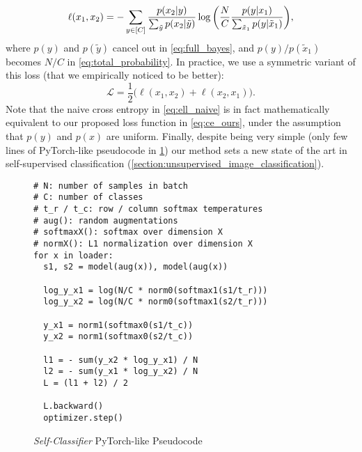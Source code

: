 \documentclass[runningheads]{llncs}
\begin{document}
\begin{equation}
    \small
    \ell(x_1, x_2) = -\sum_{y \in [C]}{\frac{p(x_2|y)}{\sum_{\tilde{y}}{p(x_2|\tilde{y})}}\log \bigg(\frac{N}{C}\frac{p(y|x_1)}{\sum_{\tilde{x}_1}{p(y|\tilde{x}_1)}}\bigg)},
    \label{eq:ce_ours}
\end{equation}
where $p(y)$ and $p(\tilde{y})$ cancel out in \cref{eq:full_bayes}, and $p(y)/p(\tilde{x}_1)$ becomes $N/C$ in \cref{eq:total_probability}. In practice, we use a symmetric variant of this loss (that we empirically noticed to be better):
\begin{equation}
    \mathcal{L} = \frac{1}{2}\bigg(\ell(x_1, x_2) + \ell(x_2, x_1)\bigg).
    \label{eq:L_sym}
\end{equation}
Note that the naive cross entropy in \cref{eq:ell_naive} is in fact mathematically equivalent to our proposed loss function in \cref{eq:ce_ours}, under the assumption that $p(y)$ and $p(x)$ are uniform. Finally, despite being very simple (only few lines of PyTorch-like pseudocode in \cref{algo:pseudo_code}) our method sets a new state of the art in self-supervised classification (\cref{section:unsupervised_image_classification}).

\begin{figure}[ht]
\centering
\begin{minipage}{.87\linewidth}
    \begin{algorithm}[H]
        \caption{{\it Self-Classifier} PyTorch-like Pseudocode}
        \begin{lstlisting}
# N: number of samples in batch
# C: number of classes
# t_r / t_c: row / column softmax temperatures
# aug(): random augmentations
# softmaxX(): softmax over dimension X
# normX(): L1 normalization over dimension X
for x in loader:
  s1, s2 = model(aug(x)), model(aug(x))

  log_y_x1 = log(N/C * norm0(softmax1(s1/t_r)))
  log_y_x2 = log(N/C * norm0(softmax1(s2/t_r)))

  y_x1 = norm1(softmax0(s1/t_c))
  y_x2 = norm1(softmax0(s2/t_c))

  l1 = - sum(y_x2 * log_y_x1) / N
  l2 = - sum(y_x1 * log_y_x2) / N
  L = (l1 + l2) / 2

  L.backward()
  optimizer.step()    
        \end{lstlisting}
        \label{algo:pseudo_code}
    \end{algorithm}
\end{minipage}
\end{figure}
\end{document}
